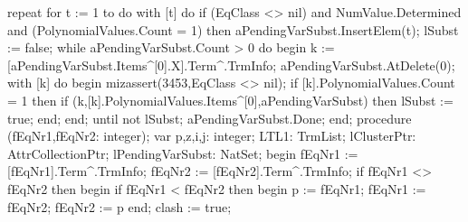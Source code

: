    repeat
      for t := 1 to  do
         with [t] do
            if (EqClass <> nil) and NumValue.Determined and
                  (PolynomialValues.Count = 1) then
               aPendingVarSubst.InsertElem(t);
      lSubst := false;
      while aPendingVarSubst.Count > 0 do
      begin
         k := [aPendingVarSubst.Items^[0].X].Term^.TrmInfo;
         aPendingVarSubst.AtDelete(0);
         with [k] do
         begin
            mizassert(3453,EqClass <> nil);
            if [k].PolynomialValues.Count = 1 then
               if (k,[k].PolynomialValues.Items^[0],aPendingVarSubst) then
                  lSubst := true;
         end;
      end;
   until not lSubst;
   aPendingVarSubst.Done;
end;
\eatline
{}\nwendcode{}\nwdocspar
\nwenddocs{}\endmoddef\nwstartdeflinemarkup{}\nwenddeflinemarkup
procedure (fEqNr1,fEqNr2: integer);
var
   p,z,i,j: integer;
   LTL1: TrmList;
   lClusterPtr: AttrCollectionPtr;
   lPendingVarSubst: NatSet;
begin
   fEqNr1 := [fEqNr1].Term^.TrmInfo;
   fEqNr2 := [fEqNr2].Term^.TrmInfo;
   if fEqNr1 <> fEqNr2 then
   begin
      if fEqNr1 < fEqNr2 then
      begin
         p := fEqNr1;
         fEqNr1 := fEqNr2;
         fEqNr2 := p
      end;
      clash := true;
